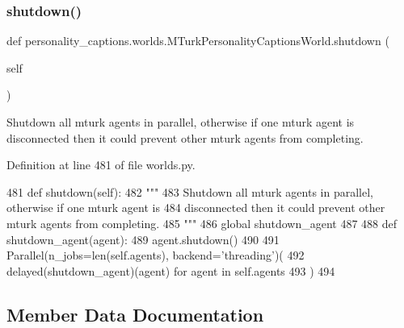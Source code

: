 \subsubsection{\texorpdfstring{shutdown()}{shutdown()}}
{\footnotesize\ttfamily def personality\+\_\+captions.\+worlds.\+M\+Turk\+Personality\+Captions\+World.\+shutdown (\begin{DoxyParamCaption}\item[{}]{self }\end{DoxyParamCaption})}

\begin{DoxyVerb}Shutdown all mturk agents in parallel, otherwise if one mturk agent is
disconnected then it could prevent other mturk agents from completing.
\end{DoxyVerb}
 

Definition at line 481 of file worlds.\+py.


\begin{DoxyCode}
481     \textcolor{keyword}{def }shutdown(self):
482         \textcolor{stringliteral}{"""}
483 \textcolor{stringliteral}{        Shutdown all mturk agents in parallel, otherwise if one mturk agent is}
484 \textcolor{stringliteral}{        disconnected then it could prevent other mturk agents from completing.}
485 \textcolor{stringliteral}{        """}
486         \textcolor{keyword}{global} shutdown\_agent
487 
488         \textcolor{keyword}{def }shutdown\_agent(agent):
489             agent.shutdown()
490 
491         Parallel(n\_jobs=len(self.agents), backend=\textcolor{stringliteral}{'threading'})(
492             delayed(shutdown\_agent)(agent) \textcolor{keywordflow}{for} agent \textcolor{keywordflow}{in} self.agents
493         )
494 \end{DoxyCode}


\subsection{Member Data Documentation}
\mbox{\label{classpersonality__captions_1_1worlds_1_1MTurkPersonalityCaptionsWorld_a3626a4fc2845b1a6942c9bd825aca0e2}} 
